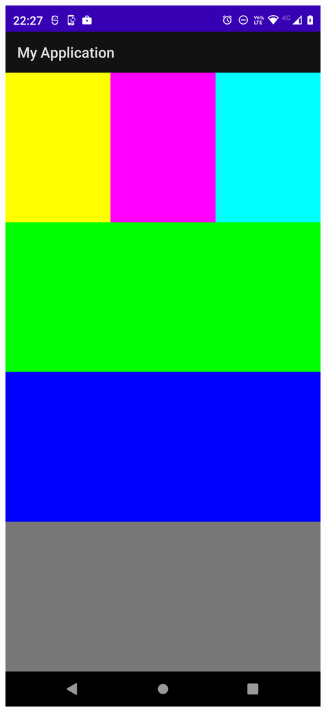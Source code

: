 \begin{frame}[fragile]
\begin{columns}
\begin{center}
\includegraphics[width=0.95\linewidth]{00_CambiosInterfaz/Fase2.png}    
\end{center}
\end{columns}
\end{frame}

